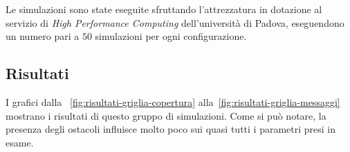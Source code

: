 Le simulazioni sono state eseguite sfruttando l'attrezzatura in dotazione al servizio di \textit{High Performance Computing} dell'università di Padova,
eseguendono un numero pari a $50$ simulazioni per ogni configurazione.
%
%
\subsection{Risultati}\label{sec:configurazione-griglia-risultati}
I grafici dalla \figurename~\ref{fig:risultati-griglia-copertura} alla~\ref{fig:risultati-griglia-messaggi}
mostrano i risultati di questo gruppo di simulazioni.
Come si può notare, la presenza degli ostacoli influisce molto poco sui quasi tutti i parametri presi in esame.
